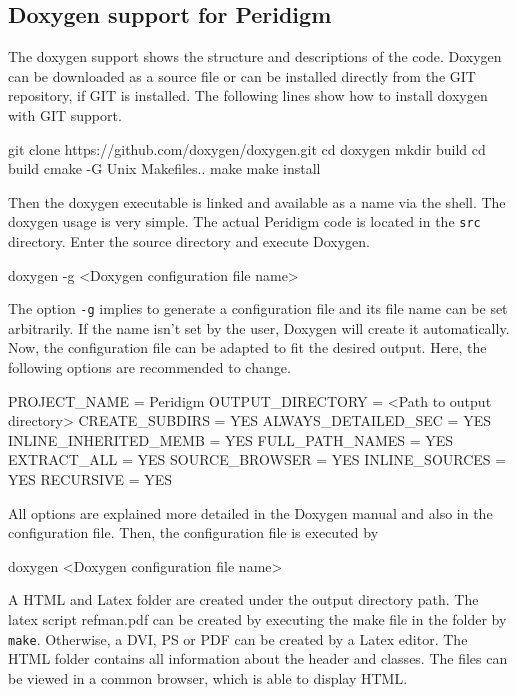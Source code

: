  \subsection{Doxygen support for Peridigm}
  The doxygen support shows the structure and descriptions of the code. Doxygen can be downloaded as a source file or can be installed directly from the GIT repository, if GIT is installed. 
  The following lines show how to install doxygen with GIT support. \\
\begin{code}
git clone https://github.com/doxygen/doxygen.git 
cd doxygen 
mkdir build 
cd build 
cmake -G \dq Unix Makefiles\dq .. 
make 
make install
\end{code}
  Then the doxygen executable is linked and available as a name via the shell. The doxygen usage is very simple. The actual Peridigm code is located in the \texttt{src} directory. Enter the source directory and 
  execute Doxygen. 
\begin{code}
 doxygen -g <Doxygen configuration file name>
\end{code}
  The option \texttt{-g} implies to generate a configuration file and its file name can be set arbitrarily. If the name isn't set by the user, Doxygen will create it automatically. Now, the configuration file can be
  adapted to fit the desired output. Here, the following options are recommended to change.
\begin{code}
PROJECT_NAME           = \dq Peridigm\dq 
OUTPUT_DIRECTORY       = <Path to output directory> 
CREATE_SUBDIRS         = YES 
ALWAYS_DETAILED_SEC    = YES 
INLINE_INHERITED_MEMB  = YES 
FULL_PATH_NAMES        = YES 
EXTRACT_ALL            = YES 
SOURCE_BROWSER         = YES 
INLINE_SOURCES         = YES 
RECURSIVE              = YES 
\end{code}
  All options are explained more detailed in the Doxygen manual and also in the configuration file. Then, the configuration file is executed by 
\begin{code}
doxygen <Doxygen configuration file name>
\end{code}
  A HTML and Latex folder are created under the output directory path. The latex script refman.pdf can be created by executing the make file in the folder by \texttt{make}. Otherwise, a DVI, PS or PDF can be created
  by a Latex editor. The HTML folder contains all information about the header and classes. The files can be viewed in a common browser, which is able to display HTML. 
